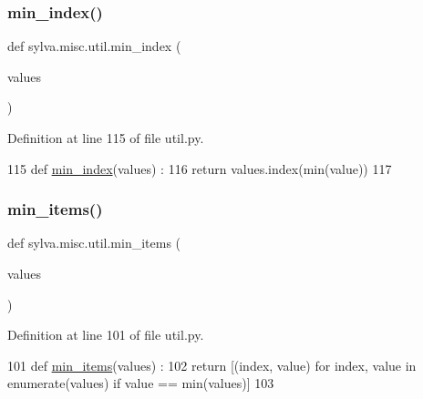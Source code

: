 \subsubsection{\texorpdfstring{min\+\_\+index()}{min\_index()}}
{\footnotesize\ttfamily def sylva.\+misc.\+util.\+min\+\_\+index (\begin{DoxyParamCaption}\item[{}]{values }\end{DoxyParamCaption})}



Definition at line 115 of file util.\+py.


\begin{DoxyCode}
115 \textcolor{keyword}{def }\hyperlink{namespacesylva_1_1misc_1_1util_a167f655cf126d75c98e671a0672087ca}{min\_index}(values) :
116   \textcolor{keywordflow}{return} values.index(min(value))
117 
\end{DoxyCode}
\mbox{\label{namespacesylva_1_1misc_1_1util_a7fdf694403cc19390b498aa430354a22}} 
\subsubsection{\texorpdfstring{min\+\_\+items()}{min\_items()}}
{\footnotesize\ttfamily def sylva.\+misc.\+util.\+min\+\_\+items (\begin{DoxyParamCaption}\item[{}]{values }\end{DoxyParamCaption})}



Definition at line 101 of file util.\+py.


\begin{DoxyCode}
101 \textcolor{keyword}{def }\hyperlink{namespacesylva_1_1misc_1_1util_a7fdf694403cc19390b498aa430354a22}{min\_items}(values) :
102   \textcolor{keywordflow}{return} [(index, value) \textcolor{keywordflow}{for} index, value \textcolor{keywordflow}{in} enumerate(values) \textcolor{keywordflow}{if} value == min(values)]
103 
\end{DoxyCode}
\mbox{\label{namespacesylva_1_1misc_1_1util_a54b027582331f484228cb0a1acac2d90}} 
